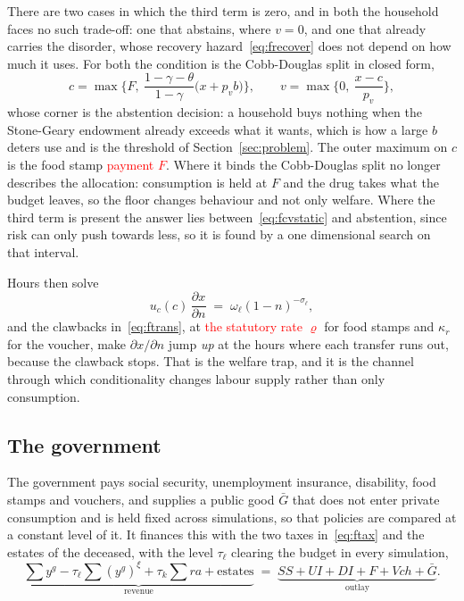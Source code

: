 \documentclass[10pt]{article}
\begin{document}
There are two cases in which the third term is zero, and in both the
household faces no such trade-off: one
that abstains, where $v=0$, and one that already carries the disorder, whose
recovery hazard~\eqref{eq:frecover} does not depend on how much it uses. For both
the condition is the Cobb-Douglas split in closed form,
\begin{equation}\label{eq:fcvstatic}
c=\max\Big\{F,\ \frac{1-\gamma-\theta}{1-\gamma}\big(x+p_v b\big)\Big\},
\qquad
v=\max\Big\{0,\ \frac{x-c}{p_v}\Big\},
\end{equation}
whose corner is the abstention decision: a household buys nothing when the
Stone-Geary endowment already exceeds what it wants, which is how a large $b$
deters use and is the threshold of Section~\ref{sec:problem}. The outer
maximum on $c$ is the food stamp \textcolor{red}{payment $F$}. Where it binds the Cobb-Douglas split no
longer describes the allocation: consumption is held at $F$ and the drug takes
what the budget leaves, so the floor changes behaviour and not only welfare. Where the third
term is present the answer lies between~\eqref{eq:fcvstatic} and abstention,
since risk can only push towards less, so it is found by a one dimensional search
on that interval.

Hours then solve
\begin{equation}\label{eq:ffoc}
u_c(c)\,\frac{\partial x}{\partial n}\;=\;\omega_{\ell}(1-n)^{-\sigma_{\ell}} ,
\end{equation}
and the clawbacks in~\eqref{eq:ftrans}, at \textcolor{red}{the statutory rate $\varrho$} for food stamps and
$\kappa_r$ for the voucher, make $\partial x/\partial n$ jump \emph{up} at the
hours where each transfer runs out, because the clawback stops. That is the
welfare trap, and it is the channel through which conditionality changes labour
supply rather than only consumption.

\subsection{The government}

The government pays social security, unemployment insurance,
disability, food stamps and
vouchers, and supplies a public good $\bar G$ that does
not enter private consumption and is held fixed across simulations, so that
policies are compared at a constant level of it. It finances this with the two
taxes in~\eqref{eq:ftax} and
the estates of the deceased, with the level $\tau_{\ell}$ clearing the
budget in every simulation,
\begin{equation}\label{eq:fgovt}
\underbrace{\textstyle\sum y^{g}-\tau_{\ell}\sum (y^{g})^{\xi}
+\tau_k\sum ra+\text{estates}}_{\text{revenue}}
\;=\;
\underbrace{SS+UI+DI+F+V\!ch+\bar G}_{\text{outlay}} .
\end{equation}
\end{document}
